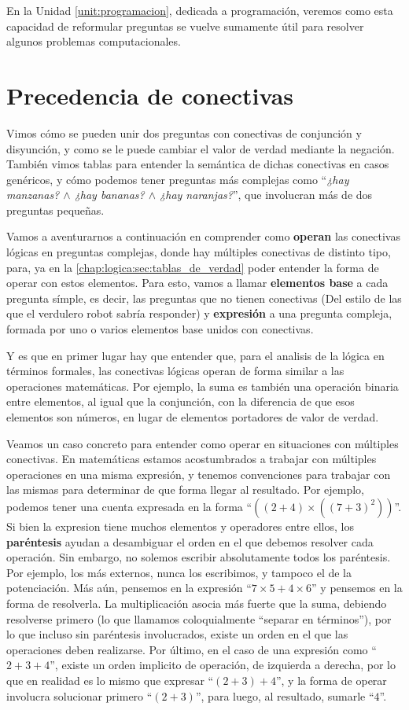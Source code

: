 En la Unidad \ref{unit:programacion}, dedicada a programación, veremos como esta
capacidad de reformular preguntas se vuelve sumamente útil para resolver algunos
problemas computacionales.

\section{Precedencia de conectivas}
\label{chap:logica:sec:precedencia}

Vimos cómo se pueden unir dos preguntas con conectivas de conjunción y
disyunción, y como se le puede cambiar el valor de verdad mediante la negación.
También vimos tablas para entender la semántica de dichas conectivas en casos
genéricos, y cómo podemos tener preguntas más complejas como ``\textit{¿hay
manzanas? $\land$ ¿hay bananas? $\land$ ¿hay naranjas?}'', que involucran más de
dos preguntas pequeñas.

Vamos a aventurarnos a continuación en comprender como \textbf{operan} las
conectivas lógicas en preguntas complejas, donde hay múltiples conectivas de
distinto tipo, para, ya en la \autoref{chap:logica:sec:tablas_de_verdad} poder
entender la forma de operar con estos elementos. Para esto, vamos a llamar
\textbf{elementos base} a cada pregunta símple, es decir, las preguntas que no
tienen conectivas (Del estilo de las que el verdulero robot sabría responder) y
\textbf{expresión} a una pregunta compleja, formada por uno o varios elementos
base unidos con conectivas.

Y es que en primer lugar hay que entender que, para el analisis de la lógica en
términos formales, las conectivas lógicas operan de forma similar a las
operaciones matemáticas. Por ejemplo, la suma es también una operación binaria
entre elementos, al igual que la conjunción, con la diferencia de que esos
elementos son números, en lugar de elementos portadores de valor de verdad.

Veamos un caso concreto para entender como operar en situaciones con múltiples
conectivas. En matemáticas estamos acostumbrados a trabajar con múltiples
operaciones en una misma expresión, y tenemos convenciones para trabajar con las
mismas para determinar de que forma llegar al resultado. Por ejemplo, podemos
tener una cuenta expresada en la forma ``$((2+4) \times ((7+3)^2))$''. Si bien
la expresion tiene muchos elementos y operadores entre ellos, los
\textbf{paréntesis} ayudan a desambiguar el orden en el que debemos resolver
cada operación. Sin embargo, no solemos escribir absolutamente todos los
paréntesis. Por ejemplo, los más externos, nunca los escribimos, y tampoco el de
la potenciación. Más aún, pensemos en la expresión ``$7 \times 5 + 4 \times 6$''
y pensemos en la forma de resolverla. La multiplicación asocia más fuerte que la
suma, debiendo resolverse primero (lo que llamamos coloquialmente ``separar en
términos''), por lo que incluso sin paréntesis involucrados, existe un orden en
el que las operaciones deben realizarse. Por último, en el caso de una expresión
como ``$2 + 3 + 4$'', existe un orden implicito de operación, de izquierda a
derecha, por lo que en realidad es lo mismo que expresar ``$(2 + 3) + 4$'', y la
forma de operar involucra solucionar primero ``$(2 + 3)$'', para luego, al
resultado, sumarle ``$4$''.


